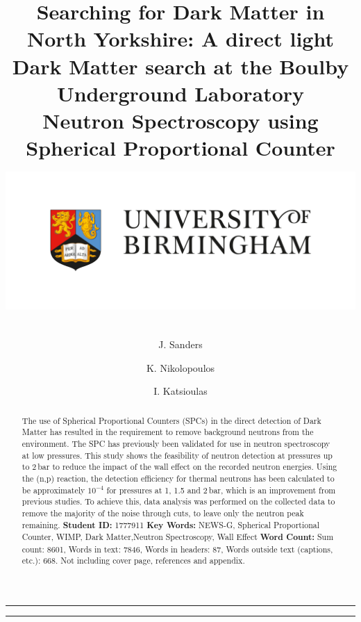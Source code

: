 \documentclass[a4paper]{article}
\title{\huge Searching for Dark Matter in North Yorkshire: A direct light Dark
Matter search at the Boulby Underground Laboratory\\ \bigskip  \LARGE Neutron Spectroscopy using Spherical Proportional Counter
\newline \includegraphics[height=6cm]{plots/bham.png}}
\author[$\ssymbol{2}$]{J. Sanders}
\author[$\ssymbol{2}$]{K. Nikolopoulos}
\author[$\ssymbol{2}$]{I. Katsioulas}
\affil[$\ssymbol{2}$]{School of Physics and Astronomy, University of Birmingham,
Birmingham, B15 2TT, United Kingdom}
\begin{document}

\maketitle
\thispagestyle

\rule{411.8pt}{1pt}
\begin{abstract}
\noindent The use of Spherical Proportional Counters (SPCs) in the direct detection of Dark Matter has resulted in the requirement to remove background neutrons from the environment. The SPC has previously been validated for use in neutron spectroscopy at low pressures. This study shows the feasibility of neutron detection at pressures up to 2\,bar to reduce the impact of the wall effect on the recorded neutron energies. Using the (n,p) reaction, the detection efficiency for thermal neutrons has been calculated to be approximately $10^{-4}$ for pressures at 1, 1.5 and 2\,bar, which is an improvement from previous studies. To achieve this, data analysis was performed on the collected data to remove the majority of the noise through cuts, to leave only the neutron peak remaining. 
\newline\linebreak
\newline\textbf{Student ID:} 1777911
\newline\textbf{Key Words:} NEWS-G, Spherical Proportional Counter, WIMP, Dark Matter,Neutron Spectroscopy, Wall Effect
\newline\textbf{Word Count:} Sum count: 8601, Words in text: 7846, Words in headers: 87, Words outside text (captions, etc.): 668. Not including cover page, references and appendix.
\end{abstract}


\rule{411.8pt}{1pt}
\newpage
\setcounter{page}{1}
\tableofcontents
\newpage
\boldmath
\end{document}
